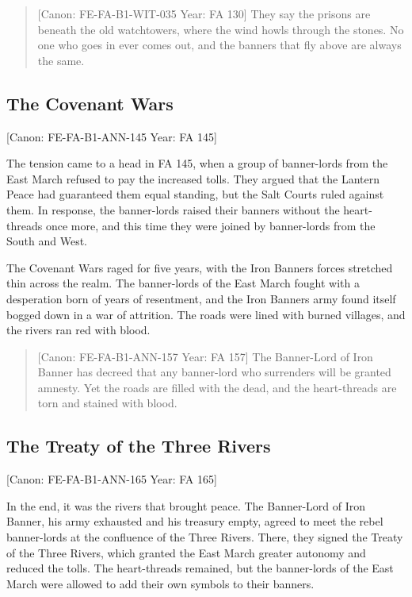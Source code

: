 \begin{quote}
{[}Canon: FE-FA-B1-WIT-035 \textbar{} Year: FA 130{]} They say the
prisons are beneath the old watchtowers, where the wind howls through
the stones. No one who goes in ever comes out, and the banners that fly
above are always the same.
\end{quote}

\subsection{The Covenant Wars}\label{the-covenant-wars}

{[}Canon: FE-FA-B1-ANN-145 \textbar{} Year: FA 145{]}

The tension came to a head in FA 145, when a group of banner-lords from
the East March refused to pay the increased tolls. They argued that the
Lantern Peace had guaranteed them equal standing, but the Salt Courts
ruled against them. In response, the banner-lords raised their banners
without the heart-threads once more, and this time they were joined by
banner-lords from the South and West.

The Covenant Wars raged for five years, with the Iron
Banner\textquotesingle s forces stretched thin across the realm. The
banner-lords of the East March fought with a desperation born of years
of resentment, and the Iron Banner\textquotesingle s army found itself
bogged down in a war of attrition. The roads were lined with burned
villages, and the rivers ran red with blood.

\begin{quote}
{[}Canon: FE-FA-B1-ANN-157 \textbar{} Year: FA 157{]} The Banner-Lord of
Iron Banner has decreed that any banner-lord who surrenders will be
granted amnesty. Yet the roads are filled with the dead, and the
heart-threads are torn and stained with blood.
\end{quote}

\subsection{The Treaty of the Three
Rivers}\label{the-treaty-of-the-three-rivers}

{[}Canon: FE-FA-B1-ANN-165 \textbar{} Year: FA 165{]}

In the end, it was the rivers that brought peace. The Banner-Lord of
Iron Banner, his army exhausted and his treasury empty, agreed to meet
the rebel banner-lords at the confluence of the Three Rivers. There,
they signed the Treaty of the Three Rivers, which granted the East March
greater autonomy and reduced the tolls. The heart-threads remained, but
the banner-lords of the East March were allowed to add their own symbols
to their banners.

